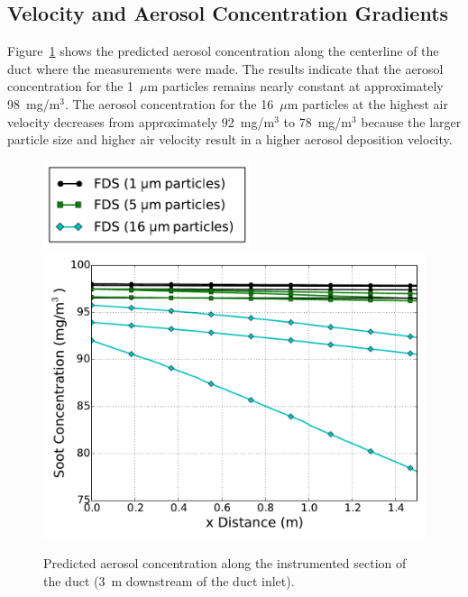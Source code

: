 \subsection{Velocity and Aerosol Concentration Gradients}

Figure~\ref{fig:Sippola_Aerosol_Deposition_Concentration} shows the predicted aerosol concentration along the centerline of the duct where the measurements were made. The results indicate that the aerosol concentration for the 1~$\mu$m particles remains nearly constant at approximately 98~mg/m$^3$. The aerosol concentration for the 16~$\mu$m particles at the highest air velocity decreases from approximately 92~mg/m$^3$ to 78~mg/m$^3$ because the larger particle size and higher air velocity result in a higher aerosol deposition velocity.

\begin{figure}[!ht]
\includegraphics[width=2.4in]{Fig_Sippola_Aerosol_Deposition_Legend_Lines.pdf} \\
\includegraphics[width=5.0in]{Fig_Sippola_Aerosol_Deposition_Soot_Concentration_All.pdf}
\caption[Predicted aerosol concentration]
{Predicted aerosol concentration along the instrumented section of the duct (3~m downstream of the duct inlet).}
\label{fig:Sippola_Aerosol_Deposition_Concentration}
\end{figure}


